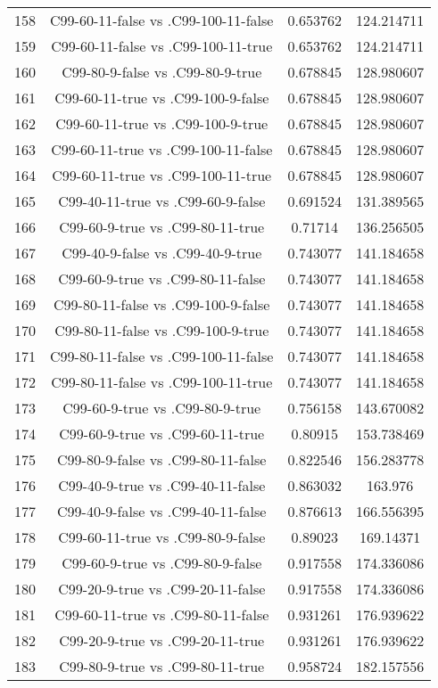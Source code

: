 \documentclass[a4paper,10pt]{article}
\begin{document}
\begin{landscape}
\begin{table}[!htp]
\begin{tabular}{cccc}
158&C99-60-11-false vs .C99-100-11-false&0.653762&124.214711\\
159&C99-60-11-false vs .C99-100-11-true&0.653762&124.214711\\
160&C99-80-9-false vs .C99-80-9-true&0.678845&128.980607\\
161&C99-60-11-true vs .C99-100-9-false&0.678845&128.980607\\
162&C99-60-11-true vs .C99-100-9-true&0.678845&128.980607\\
163&C99-60-11-true vs .C99-100-11-false&0.678845&128.980607\\
164&C99-60-11-true vs .C99-100-11-true&0.678845&128.980607\\
165&C99-40-11-true vs .C99-60-9-false&0.691524&131.389565\\
166&C99-60-9-true vs .C99-80-11-true&0.71714&136.256505\\
167&C99-40-9-false vs .C99-40-9-true&0.743077&141.184658\\
168&C99-60-9-true vs .C99-80-11-false&0.743077&141.184658\\
169&C99-80-11-false vs .C99-100-9-false&0.743077&141.184658\\
170&C99-80-11-false vs .C99-100-9-true&0.743077&141.184658\\
171&C99-80-11-false vs .C99-100-11-false&0.743077&141.184658\\
172&C99-80-11-false vs .C99-100-11-true&0.743077&141.184658\\
173&C99-60-9-true vs .C99-80-9-true&0.756158&143.670082\\
174&C99-60-9-true vs .C99-60-11-true&0.80915&153.738469\\
175&C99-80-9-false vs .C99-80-11-false&0.822546&156.283778\\
176&C99-40-9-true vs .C99-40-11-false&0.863032&163.976\\
177&C99-40-9-false vs .C99-40-11-false&0.876613&166.556395\\
178&C99-60-11-true vs .C99-80-9-false&0.89023&169.14371\\
179&C99-60-9-true vs .C99-80-9-false&0.917558&174.336086\\
180&C99-20-9-true vs .C99-20-11-false&0.917558&174.336086\\
181&C99-60-11-true vs .C99-80-11-false&0.931261&176.939622\\
182&C99-20-9-true vs .C99-20-11-true&0.931261&176.939622\\
183&C99-80-9-true vs .C99-80-11-true&0.958724&182.157556\\

\end{tabular}
\end{table}
\end{landscape}
\end{document}
